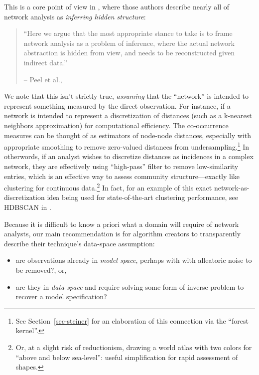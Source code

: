 \documentclass[%
	12pt,
		oneside,
		letterpaper
]{book}
\providecommand{\tightlist}{%
  \setlength{\itemsep}{0pt}\setlength{\parskip}{0pt}}
\begin{document}
This is a core point of view in
\textcite{Statisticalinferencelinks_Peel2022}, where those authors
describe nearly all of network analysis as \emph{inferring hidden
structure}:

\singlespacing

\begin{quote}
``Here we argue that the most appropriate stance to take is to frame
network analysis as a problem of inference, where the actual network
abstraction is hidden from view, and needs to be reconstructed given
indirect data.''

\hfill -- Peel et al., \autocite{Statisticalinferencelinks_Peel2022}
\end{quote}

\doublespacing

We note that this isn't strictly true, \emph{assuming} that the
``network'' is intended to represent something measured by the direct
observation. For instance, if a network is intended to represent a
discretization of distances (such as a k-nearest neighbors
approximation) for computational efficiency. The co-occurrence measures
can be thought of as estimators of node-node distances, especially with
appropriate smoothing to remove zero-valued distances from
undersampling.\footnote{ See Section~\ref{sec-steiner} for an
  elaboration of this connection via the ``forest kernel''.} In
otherwords, if an analyst wishes to discretize distances as incidences
in a complex network, they are effectively using ``high-pass'' filter to
remove low-similarity entries, which is an effective way to assess
community structure---exactly like clustering for continuous
data.\footnote{ Or, at a slight risk of reductionism, drawing a world
  atlas with two colors for ``above and below sea-level'': useful
  simplification for rapid assessment of shapes.} In fact, for an
example of this exact network-as-discretization idea being used for
state-of-the-art clustering performance, see HDBSCAN in
\textcite{HybridApproachHierarchical_Malzer2020}.

Because it is difficult to know a priori what a domain will require of
network analysts, our main recommendation is for algorithm creators to
transparently describe their technique's data-space assumption:

\begin{itemize}
\tightlist
\item
  are observations already in \emph{model space}, perhaps with with
  alleatoric noise to be removed?, or,
\item
  are they in \emph{data space} and require solving some form of inverse
  problem to recover a model specification?
\end{itemize}
\end{document}
